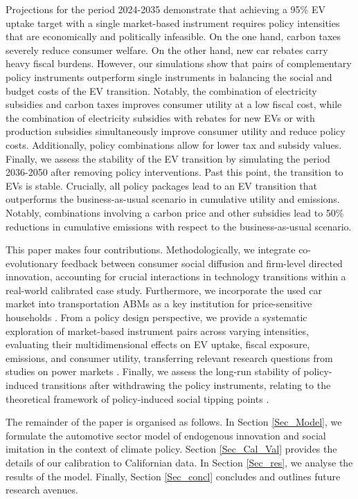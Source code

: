 \documentclass[12pt]{article}
\begin{document}
Projections for the period 2024-2035 demonstrate that achieving a 95\% EV uptake target with a single market-based instrument requires policy intensities that are economically and politically infeasible. On the one hand, carbon taxes severely reduce consumer welfare. On the other hand, new car rebates carry heavy fiscal burdens. However, our simulations show that pairs of complementary policy instruments outperform single instruments in balancing the social and budget costs of the EV transition. Notably, the combination of electricity subsidies and carbon taxes improves consumer utility at a low fiscal cost, while the combination of electricity subsidies with rebates for new EVs or with production subsidies simultaneously improve consumer utility and reduce policy costs. Additionally, policy combinations allow for lower tax and subsidy values. Finally, we assess the stability of the EV transition by simulating the period 2036-2050 after removing policy interventions. Past this point, the transition to EVs is stable. Crucially, all policy packages lead to an EV transition that outperforms the business-as-usual scenario in cumulative utility and emissions. Notably, combinations involving a carbon price and other subsidies lead to 50\% reductions in cumulative emissions with respect to the business-as-usual scenario.%

This paper makes four contributions. Methodologically, we integrate co-evolutionary feedback between consumer social diffusion and firm-level directed innovation, accounting for crucial interactions in technology transitions \citep{dijk2013incorporating} within a real-world calibrated case study. Furthermore, we incorporate the used car market into transportation ABMs as a key institution for price-sensitive households \citep{Muehlegger2018Understanding}. From a policy design perspective, we provide a systematic exploration of market-based instrument pairs across varying intensities, evaluating their multidimensional effects on EV uptake, fiscal exposure, emissions, and consumer utility, transferring relevant research questions from studies on power markets \citep{savin2022agent,nunez2022beyond}. Finally, we assess the long-run stability of policy-induced transitions after withdrawing the policy instruments, relating to the theoretical framework of policy-induced social tipping points \citep{vanderPloeg2025}.

The remainder of the paper is organised as follows. In Section \ref{Sec_Model}, we formulate the automotive sector model of endogenous innovation and social imitation in the context of climate policy. Section \ref{Sec_Cal_Val} provides the details of our calibration to Californian data. In Section \ref{Sec_res}, we analyse the results of the model. Finally, Section \ref{Sec_concl} concludes and outlines future research avenues.
\end{document}
